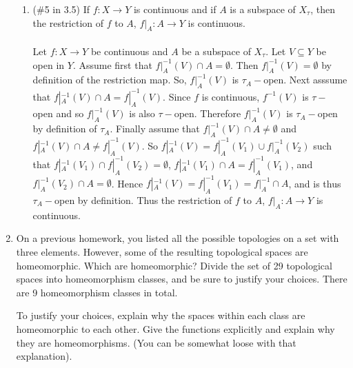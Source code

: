 \documentclass[12pt]{article}
\begin{document}
\begin{enumerate}
\begin{enumerate}
\item (\#5 in 3.5) If $f:X\to Y$ is continuous and if $A$ is a subspace of $X_{\tau}$, then the restriction of $f$ to $A$, $f|_{A}:A\to Y$ is continuous.\\\\
Let $f:X\to Y$ be continuous and $A$ be a subspace of $X_{\tau}$. Let $V\subseteq Y$ be open in $Y$. Assume first that $f|_{A}^{-1}(V)\cap A=\emptyset$. Then $f|_{A}^{-1}(V)=\emptyset$ by definition of the restriction map. So, $f|_{A}^{-1}(V)$ is $\tau_{A}-$open. Next asssume that $f|_{A}^{-1}(V)\cap A=f|_{A}^{-1}(V)$. Since $f$ is continuous, $f^{-1}(V)$ is $\tau-$open and so $f|_{A}^{-1}(V)$ is also $\tau-$open. Therefore $f|_{A}^{-1}(V)$ is $\tau_{A}-$open by definition of $\tau_{A}$. Finally assume that $f|_{A}^{-1}(V)\cap A\neq\emptyset$ and $f|_{A}^{-1}(V)\cap A\neq f|_{A}^{-1}(V)$. So $f|_{A}^{-1}(V)=f|_{A}^{-1}(V_1)\cup f|_{A}^{-1}(V_2)$ such that $f|_{A}^{-1}(V_1)\cap f|_{A}^{-1}(V_2)=\emptyset$, $f|_{A}^{-1}(V_1)\cap A=f|_{A}^{-1}(V_1)$, and $f|_{A}^{-1}(V_2)\cap A=\emptyset$. Hence $f|_{A}^{-1}(V)=f|_{A}^{-1}(V_1)=f|_{A}^{-1}\cap A$, and is thus $\tau_{A}-$open by definition. Thus the restriction of $f$ to $A$, $f|_{A}:A\to Y$ is continuous.\\[20pt]
\end{enumerate}

\item On a previous homework, you listed all the possible topologies on a set with three elements. However, some of the resulting topological spaces are homeomorphic. Which are homeomorphic? Divide the set of 29 topological spaces into homeomorphism classes, and be sure to justify your choices. There are 9 homeomorphism classes in total. 

To justify your choices, explain why the spaces within each class are homeomorphic to each other. Give the functions explicitly and explain why they are homeomorphisms. (You can be somewhat loose with that explanation). 


\end{enumerate}
\end{document}

